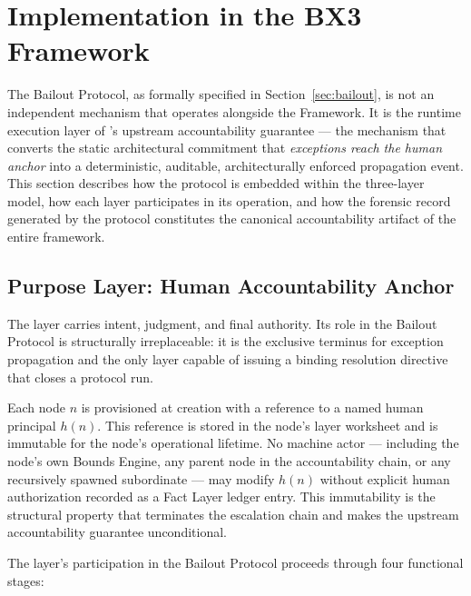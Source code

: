 \section{Implementation in the BX3 Framework}
\label{sec:implementation}

The Bailout Protocol, as formally specified in Section~\ref{sec:bailout}, is not an independent mechanism that operates alongside the \bxthree{} Framework. It is the runtime execution layer of \bxthree{}'s upstream accountability guarantee --- the mechanism that converts the static architectural commitment that \emph{exceptions reach the human anchor} into a deterministic, auditable, architecturally enforced propagation event. This section describes how the protocol is embedded within the \bxthree{} three-layer model, how each layer participates in its operation, and how the forensic record generated by the protocol constitutes the canonical accountability artifact of the entire framework.

\subsection{Purpose Layer: Human Accountability Anchor}
\label{sec:purpose-layer-anchor}

The \purpose{} layer carries intent, judgment, and final authority. Its role in the Bailout Protocol is structurally irreplaceable: it is the exclusive terminus for exception propagation and the only layer capable of issuing a binding resolution directive that closes a protocol run.

Each \bxthree{} node $n$ is provisioned at creation with a reference to a named human principal $h(n)$. This reference is stored in the node's \purpose{} layer worksheet and is immutable for the node's operational lifetime. No machine actor --- including the node's own Bounds Engine, any parent node in the accountability chain, or any recursively spawned subordinate --- may modify $h(n)$ without explicit human authorization recorded as a Fact Layer ledger entry. This immutability is the structural property that terminates the escalation chain and makes the upstream accountability guarantee unconditional.

The \purpose{} layer's participation in the Bailout Protocol proceeds through four functional stages:

